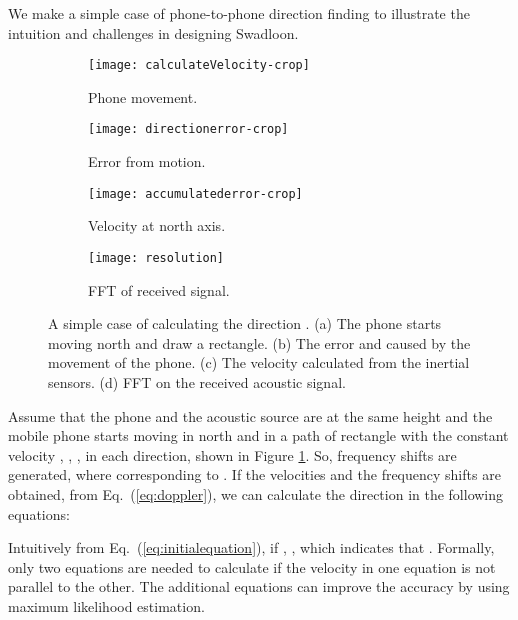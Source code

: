 \documentclass[]{sig-alternate-10pt}
\newcommand{\eqqref}[1]{Eq.~(\ref{#1})}
\def \ourprotocol{Swadloon\xspace}
\begin{document}
We make a simple case of phone-to-phone direction finding to
illustrate the intuition and challenges in designing \ourprotocol.
\begin{figure*}[t]
    \begin{center}
        \begin{subfigure}[t]{0.24\textwidth}
            \texttt{[image: calculateVelocity-crop]}
            \caption{Phone movement.}
            \label{fig:simplemovement}
        \end{subfigure}
        \begin{subfigure}[t]{0.22\textwidth}
            \texttt{[image: directionerror-crop]}
            \caption{Error from motion.}
            \label{fig:directionerror}
        \end{subfigure}
        \begin{subfigure}[t]{0.2\textwidth}
            \texttt{[image: accumulatederror-crop]}
            \caption{Velocity at north axis.}
            \label{fig:accumlateerror}
        \end{subfigure}
        \begin{subfigure}[t]{0.3\textwidth}
            \texttt{[image: resolution]}
            \caption{FFT of received signal.}
            \label{fig:fftresolution}
        \end{subfigure}
        \caption{A simple case of calculating the direction .
            (a) The phone starts moving  north and draw a rectangle. (b) The error  and  caused by the movement of the phone. (c)
            The velocity calculated from the inertial sensors. (d) FFT on the
        received acoustic signal.}
        \label{fig:asimplecase}
    \end{center}
\end{figure*}





Assume that the phone and the acoustic source are
at the same height and the mobile phone starts moving in north and in
a path of rectangle with the constant velocity , ,
,  in each direction, shown in Figure
\ref{fig:simplemovement}. So, frequency shifts are generated, where
 corresponding to .  If the velocities and the frequency  
shifts are obtained, from \eqqref{eq:doppler}, we can calculate the direction in the following
equations:

Intuitively from \eqqref{eq:initialequation}, if ,
,
which indicates that . Formally, only two equations
are needed to calculate  if the velocity in one equation is
not parallel to the other. The additional equations can improve the
accuracy by using maximum likelihood estimation.
\end{document}
